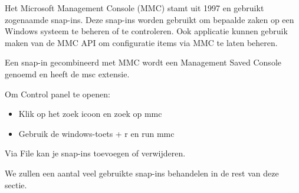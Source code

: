 Het Microsoft Management Console (MMC) stamt uit 1997 en gebruikt zogenaamde snap-ins. Deze snap-ins worden gebruikt om bepaalde zaken op een Windows systeem te beheren of te controleren. Ook applicatie kunnen gebruik maken van de MMC API om configuratie items via MMC te laten beheren.

Een snap-in gecombineerd met MMC wordt een Management Saved Console genoemd en heeft de msc extensie.

Om Control panel te openen:
\begin{itemize}
\item Klik op het zoek icoon en zoek op mmc
\item Gebruik de windows-toets + r en run mmc
\end{itemize}

\begin{minipage}[t]{\linewidth}
\raggedright
{}
\end{minipage}

Via File kan je snap-ins toevoegen of verwijderen.

We zullen een aantal veel gebruikte snap-ins behandelen in de rest van deze sectie.


